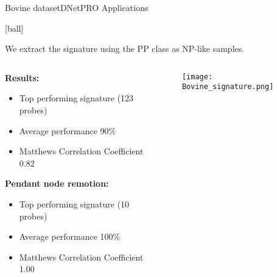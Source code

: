 \documentclass{standalone}
\begin{document}
\begin{frame}{Bovine dataset}{DNetPRO Applications}

  [ball]

  \scriptsize{We extract the signature using the PP class as NP-like samples.}

  \begin{columns}

    \begin{column}{0.4\linewidth}

      \scriptsize{\textbf{Results:}}

      \begin{itemize}
        \item Top performing signature (123 probes)
        \item Average performance 90\%
        \item Matthews Correlation Coefficient 0.82
      \end{itemize}

      \vspace{0.5cm}

      \scriptsize{\textbf{Pendant node remotion:}}

      \begin{itemize}
        \item Top performing signature (10 probes)
        \item Average performance 100\%
        \item Matthews Correlation Coefficient 1.00
      \end{itemize}

    \end{column}

    \begin{column}{0.6\linewidth}

      \begin{figure}
        \centering
        \texttt{[image: Bovine\_signature.png]}
      \end{figure}

    \end{column}

  \end{columns}

\end{frame}


\end{document}
